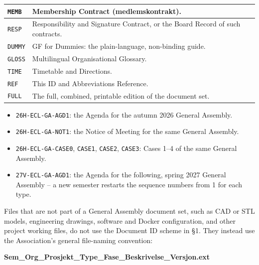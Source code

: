 \documentclass{../../../Common/Latex/Templates/rapport}
\begin{document}
\begin{longtable}{|L{2cm}|L{11.5cm}|}
  \hline
  \texttt{MEMB}   & Membership Contract (medlemskontrakt).                                                                                                                                \\
  \hline
  \texttt{RESP}   & Responsibility and Signature Contract, or the Board Record of such contracts.                                                                                         \\
  \hline
  \texttt{DUMMY}  & GF for Dummies: the plain-language, non-binding guide.                                                                                                                \\
  \hline
  \texttt{GLOSS}  & Multilingual Organisational Glossary.                                                                                                                                 \\
  \hline
  \texttt{TIME}   & Timetable and Directions.                                                                                                                                             \\
  \hline
  \texttt{REF}    & This ID and Abbreviations Reference.                                                                                                                                  \\
  \hline
  \texttt{FULL}   & The full, combined, printable edition of the document set.                                                                                                            \\
  \hline
\end{longtable}

\begin{itemize}
  \item \texttt{26H-ECL-GA-AGD1}: the Agenda for the autumn 2026 General Assembly.
  \item \texttt{26H-ECL-GA-NOT1}: the Notice of Meeting for the same General Assembly.
  \item \texttt{26H-ECL-GA-CASE0}, \texttt{CASE1}, \texttt{CASE2}, \texttt{CASE3}: Cases 1--4 of the same General Assembly.
  \item \texttt{27V-ECL-GA-AGD1}: the Agenda for the following, spring 2027 General Assembly -- a new semester restarts the sequence numbers from 1 for each type.
\end{itemize}

Files that are not part of a General Assembly document set, such as CAD or STL models, engineering drawings, software and Docker configuration, and other project working files, do not use the Document ID scheme in \S1. They instead use the Association's general file-naming convention:
\begin{center}
  \bfseries Sem\_Org\_Prosjekt\_Type\_Fase\_Beskrivelse\_Versjon.ext
\end{center}
\end{document}

